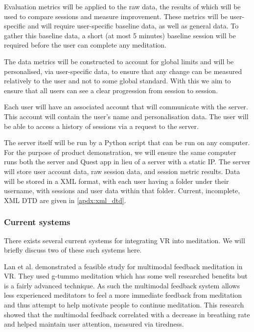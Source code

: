 \documentclass[coverpage,lineno]{../custom}
\begin{document}
Evaluation metrics will be applied to the raw data, the results of which will be used to compare sessions and measure improvement. These metrics will be user-specific and will require user-specific baseline data, as well as general data. To gather this baseline data, a short (at most 5 minutes) baseline session will be required before the user can complete any meditation.

The data metrics will be constructed to account for global limits and will be personalised, via user-specific data, to ensure that any change can be measured relatively to the user and not to some global standard. With this we aim to ensure that all users can see a clear progression from session to session.

Each user will have an associated account that will communicate with the server. This account will contain the user's name and personalisation data. The user will be able to access a history of sessions via a request to the server.

The server itself will be run by a Python script that can be run on any computer. For the purpose of product demonstration, we will ensure the same computer runs both the server and Quest app in lieu of a server with a static IP. The server will store user account data, raw session data, and session metric results. Data will be stored in a XML format, with each user having a folder under their username, with sessions and user data within that folder. Current, incomplete, XML DTD are given in \cref{apdx:xml_dtd}.

\subsubsection{Current systems}

There exists several current systems for integrating VR into meditation. We will briefly discuss two of these such systems here.

Lan et al. \cite{lan_slow_2021} demonstrated a feasible study for multimodal feedback meditation in VR. They used g-tummo meditation which has some well researched benefits \cite{kozhevnikov_neurocognitive_2013} but is a fairly advanced technique. As such the multimodal feedback system allows less experienced meditators to feel a more immediate feedback from meditation and thus attempt to help motivate people to continue meditation. This research showed that the multimodal feedback correlated with a decrease in breathing rate and helped maintain user attention, measured via tiredness.
\end{document}
